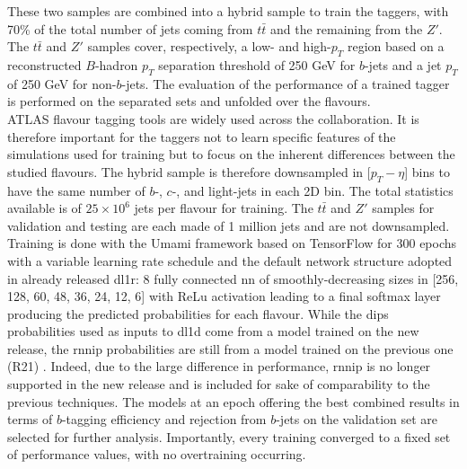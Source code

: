 These two samples are combined into a hybrid sample to train the taggers, with 70\% of the total number of jets coming from $t\bar{t}$ and the remaining from the $Z'$. The $t\bar{t}$ and $Z'$ samples cover, respectively, a low- and high-$p_T$ region based on a reconstructed $B$-hadron $p_T$ separation threshold of 250 GeV for $b$-jets and a jet $p_T$ of 250 GeV for non-$b$-jets. The evaluation of the performance of a trained tagger is performed on the separated sets and unfolded over the flavours.\\

ATLAS flavour tagging tools are widely used across the collaboration. It is therefore important for the taggers not to learn specific features of the simulations used for training but to focus on the inherent differences between the studied flavours. The hybrid sample is therefore downsampled in [$p_T - \eta$] bins to have the same number of $b$-, $c$-, and light-jets in each 2D bin. The total statistics available is of $25 \times 10^{6}$ jets per flavour for training. The $t\bar{t}$ and $Z'$ samples for validation and testing are each made of 1 million jets and are not downsampled.\\

Training is done with the Umami framework \cite{Umami} based on TensorFlow \cite{tensorflow2015-whitepaper} for 300 epochs with a variable learning rate schedule and the default network structure adopted in already released \gls{dl1r}: 8 fully connected \gls{nn} of smoothly-decreasing sizes in [256, 128, 60, 48, 36, 24, 12, 6] with ReLu activation leading to a final softmax layer producing the predicted probabilities for each flavour. While the \gls{dips} probabilities used as inputs to \gls{dl1d} come from a model trained on the new release, the \gls{rnnip} probabilities are still from a model trained on the previous one (R21) \cite{ATL-PHYS-PUB-2017-003, ATL-PHYS-PUB-2020-014}. Indeed, due to the large difference in performance, \gls{rnnip} is no longer supported in the new release and is included for sake of comparability to the previous techniques. The models at an epoch offering the best combined results in terms of $b$-tagging efficiency and rejection from $b$-jets on the validation set are selected for further analysis. Importantly, every training converged to a fixed set of performance values, with no overtraining occurring.\\

